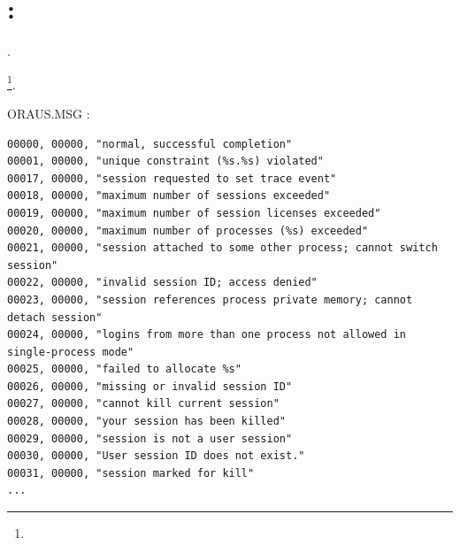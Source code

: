 ﻿\chapter{\oracle: }
\index{\oracle}

.

\footnote{
}.

 ORAUS.MSG :

\begin{lstlisting}[caption=\RU{Начало файла}\EN{Beginning of} ORAUS.MSG \RU{без комментариев}\EN{file without comments}]
00000, 00000, "normal, successful completion"
00001, 00000, "unique constraint (%s.%s) violated"
00017, 00000, "session requested to set trace event"
00018, 00000, "maximum number of sessions exceeded"
00019, 00000, "maximum number of session licenses exceeded"
00020, 00000, "maximum number of processes (%s) exceeded"
00021, 00000, "session attached to some other process; cannot switch session"
00022, 00000, "invalid session ID; access denied"
00023, 00000, "session references process private memory; cannot detach session"
00024, 00000, "logins from more than one process not allowed in single-process mode"
00025, 00000, "failed to allocate %s"
00026, 00000, "missing or invalid session ID"
00027, 00000, "cannot kill current session"
00028, 00000, "your session has been killed"
00029, 00000, "session is not a user session"
00030, 00000, "User session ID does not exist."
00031, 00000, "session marked for kill"
...
\end{lstlisting}

